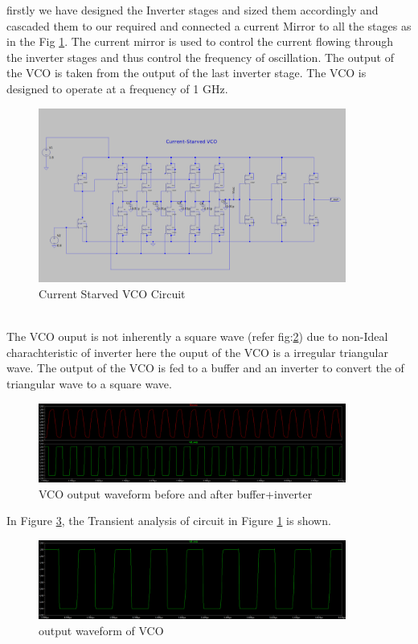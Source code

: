 firstly we have designed the Inverter stages and sized them accordingly and cascaded them to our required and connected a current Mirror to all the stages as in the Fig \ref{fig:vco_circuit}. The current mirror is used to control the current flowing through the inverter stages and thus control the frequency of oscillation. The output of the VCO is taken from the output of the last inverter stage. The VCO is designed to operate at a frequency of 1 GHz.
\begin{figure}[h]
	\centering
	\includegraphics[width=0.9\textwidth]{figs/vco_c.png}
	\caption{Current Starved VCO Circuit}
	\label{fig:vco_circuit}
	\vspace{0.5cm}
\end{figure}\\
The VCO ouput is not inherently a square wave (refer fig:\ref{fig:vco_op_c}) due to non-Ideal charachteristic of inverter here the ouput of the VCO is a irregular triangular wave. The output of the VCO is fed to a buffer and an inverter to convert the  of triangular wave to a square wave.
\begin{figure}
	\centering
	\includegraphics[width=0.9\textwidth]{figs/vco_op_both.png}
	\caption{VCO output waveform before and after buffer+inverter}
	\label{fig:vco_op_c}
	\vspace{0.5cm}
\end{figure}
In Figure \ref{fig:vco_sim}, the Transient analysis of circuit in Figure \ref{fig:vco_circuit} is shown.
\begin{figure}[H]
	\centering
	\includegraphics[width=0.9\textwidth]{figs/vco_op1.png}
	\caption{output waveform of VCO}
	\label{fig:vco_sim}
\end{figure}


